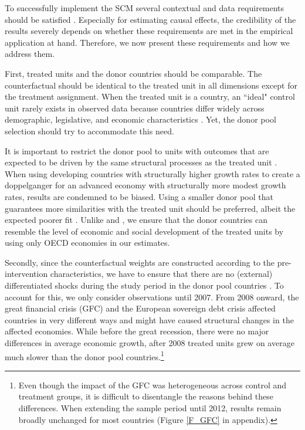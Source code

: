 \documentclass[12pt]{article}
\begin{document}
To successfully implement the SCM several contextual and data requirements should be satisfied \citep{Abadie2019}. Especially for estimating causal effects, the credibility of the results severely depends on whether these requirements are met in the empirical application at hand. Therefore, we now present these requirements and how we address them. 
 
First, treated units and the donor countries should be comparable. The counterfactual should be identical to the treated unit in all dimensions except for the treatment assignment. When the treated unit is a country, an ``ideal" control unit rarely exists in observed data because countries differ widely across demographic, legislative, and economic characteristics \citep{Born2018}. Yet, the donor pool selection should try to accommodate this need. 

It is important to restrict the donor pool to units with outcomes that are expected to be driven by the same structural processes as the treated unit \citep{Abadie2015}. When using developing countries with structurally higher growth rates to create a doppelganger for an advanced economy with structurally more modest growth rates, results are condemned to be biased. Using a smaller donor pool that guarantees more similarities with the treated unit should be preferred, albeit the expected poorer fit \citep{Abadie2003}. Unlike \cite{Puzzello2018} and \cite{Gasparotti2019}, we ensure that the donor countries can resemble the level of economic and social development of the treated units by using only OECD economies in our estimates.


Secondly, since the counterfactual weights are constructed according to the pre-intervention characteristics, we have to ensure that there are no (external) differentiated shocks during the study period in the donor pool countries \citep{Abadie2019}. To account for this, we only consider observations until 2007. From 2008 onward, the great financial crisis (GFC) and the European sovereign debt crisis affected countries in very different ways and might have caused structural changes in the affected economies. While before the great recession, there were no major differences in average economic growth, after 2008 treated units grew on average much slower than the donor pool countries.\footnote{Even though the impact of the GFC was heterogeneous across control and treatment groups, it is difficult to disentangle the reasons behind these differences. When extending the sample period until 2012, results remain broadly unchanged for most countries (Figure \ref{F_GFC} in appendix).} 
\end{document}
